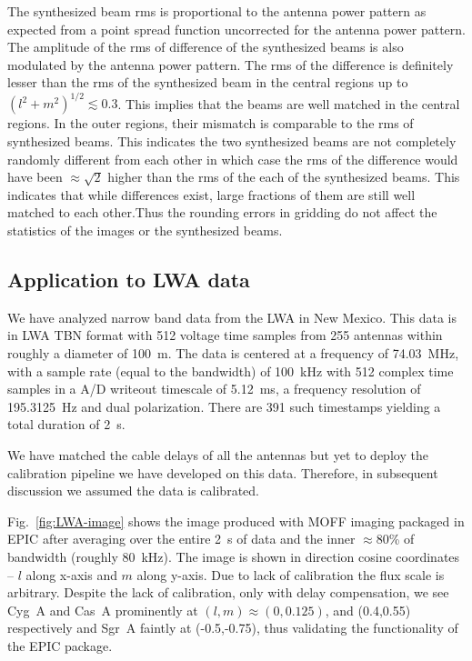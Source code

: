 \documentclass[a4paper,fleqn,usenatbib]{../mnras}
\begin{document}
The synthesized beam rms is proportional to the antenna power pattern as 
expected from a point spread function uncorrected for the antenna power 
pattern. The amplitude of the rms of difference of the synthesized beams is 
also modulated by the antenna power pattern. The rms of the difference is 
definitely lesser than the rms of the synthesized beam in the central regions 
up to $(l^2+m^2)^{1/2}\lesssim 0.3$. This implies that the beams are well 
matched in the central regions. In the outer regions, their mismatch is 
comparable to the rms of synthesized beams. This indicates the two 
synthesized beams are not completely randomly different from each other in
which case the rms of the difference would have been $\approx \sqrt{2}$
higher than the rms of the each of the synthesized beams. This indicates 
that while differences exist, large fractions of them are still well matched
to each other.Thus the rounding errors in gridding do not affect the 
statistics of the images or the synthesized beams.

\subsection{Application to LWA data}\label{sec:LWA-data}

We have analyzed narrow band data from the LWA in New Mexico. This data is  
in LWA TBN format with 512 voltage time samples from 255 antennas within 
roughly a diameter of 100~m. The data is centered at a frequency of 74.03~MHz,
with a sample rate (equal to the bandwidth) of 100~kHz with 512 complex time 
samples in a A/D writeout timescale of 5.12~ms, a frequency resolution of 
195.3125~Hz and dual polarization. There are 391 such timestamps yielding a
total duration of 2~s. 

We have matched the cable delays of all the antennas but yet to deploy the 
calibration pipeline we have developed on this data. Therefore, in 
subsequent discussion we assumed the data is calibrated. 

Fig.~\ref{fig:LWA-image} shows the image produced with MOFF imaging 
packaged in EPIC after averaging over the entire 2~s of data and the inner
$\approx 80$\% of bandwidth (roughly 80~kHz). The image is shown in direction 
cosine coordinates -- $l$ along x-axis and $m$ along y-axis. Due to lack of
calibration the flux scale is arbitrary. Despite the lack of calibration,
only with delay compensation, we see Cyg~A and Cas~A prominently at
$(l,m)\approx (0, 0.125)$, and (0.4,0.55) respectively and Sgr~A faintly at
(-0.5,-0.75), thus validating the functionality of the EPIC package.
\end{document}
